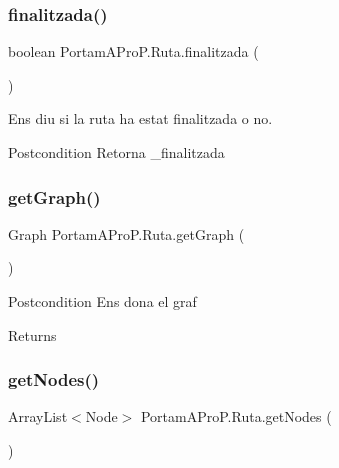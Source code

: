 \subsubsection{\texorpdfstring{finalitzada()}{finalitzada()}}
{\footnotesize\ttfamily boolean Portam\+A\+Pro\+P.\+Ruta.\+finalitzada (\begin{DoxyParamCaption}{ }\end{DoxyParamCaption})}



Ens diu si la ruta ha estat finalitzada o no. 

\begin{DoxyPostcond}{Postcondition}
Retorna \+\_\+finalitzada 
\end{DoxyPostcond}
\mbox{\label{class_portam_a_pro_p_1_1_ruta_ae131ddbcf7bb38b74606c6d17038127e}} 
\subsubsection{\texorpdfstring{get\+Graph()}{getGraph()}}
{\footnotesize\ttfamily Graph Portam\+A\+Pro\+P.\+Ruta.\+get\+Graph (\begin{DoxyParamCaption}{ }\end{DoxyParamCaption})}

\begin{DoxyPostcond}{Postcondition}
Ens dona el graf 
\end{DoxyPostcond}
\begin{DoxyReturn}{Returns}

\end{DoxyReturn}
\mbox{\label{class_portam_a_pro_p_1_1_ruta_ac3c8cf0f68e31d67b32cc9e7e0914f46}} 
\subsubsection{\texorpdfstring{get\+Nodes()}{getNodes()}}
{\footnotesize\ttfamily Array\+List$<$Node$>$ Portam\+A\+Pro\+P.\+Ruta.\+get\+Nodes (\begin{DoxyParamCaption}{ }\end{DoxyParamCaption})}

